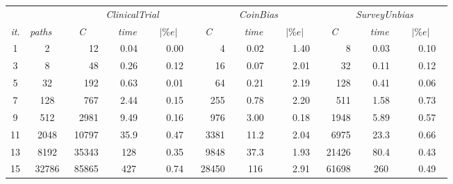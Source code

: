 \documentclass[a4paper]{llncs}
\begin{document}
\begin{table}[t]
{\begin{tabular}{ccrccrccrcc}
    \midrule
    & & \multicolumn{3}{c}{\emph{ClinicalTrial}}&\multicolumn{3}{c}{\emph{CoinBias}} & \multicolumn{3}{c}{\emph{SurveyUnbias}} \\
         \cmidrule(l){3-5}  \cmidrule(l){6-8} \cmidrule(l){9-11}  
    \emph{it.} & \emph{paths}  \ \ & \emph{C} \ \ & \ \ \emph{time} \ \ & \emph{$|\%e|$} \ \ &\ \emph{C} \ \ & \ \ \emph{time} \ \ & \emph{$|\%e|$} \ \ & \emph{C} \ \ & \ \ \emph{time} \ \ & \emph{$|\%e|$} \ \ \\
    \midrule  
    1 & 2  & 12 & 0.04 & 0.00 & 4 & 0.02 & 1.40 & 8 & 0.03 & 0.10 \\
    3 & 8  & 48 & 0.26 & 0.12 & 16 & 0.07 & 2.01 & 32 & 0.11 & 0.12 \\
    5 & 32 & 192 & 0.63 & 0.01 & 64 & 0.21 & 2.19 & 128 & 0.41 & 0.06 \\
    7 & 128 & 767 & 2.44 & 0.15 & 255 & 0.78 & 2.20 & 511 & 1.58 & 0.73 \\
    9 & 512 & 2981 & 9.49 & 0.16 & 976 & 3.00 & 0.18 & 1948 & 5.89 & 0.57 \\
    11 & 2048 & 10797 & 35.9 & 0.47 & 3381 & 11.2 & 2.04 & 6975 & 23.3 & 0.66 \\
    13 & 8192 & 35343 & 128 & 0.35 & 9848 & 37.3 & 1.93 & 21426 & 80.4 & 0.43 \\
    15 & 32786 & 85865 & 427 & 0.74 & 28450 & 116 & 2.91 & 61698 & 260 & 0.49 \\
   \bottomrule
   \end{tabular}}
   \label{tab:sensBranch}
\end{table}
\end{document}
